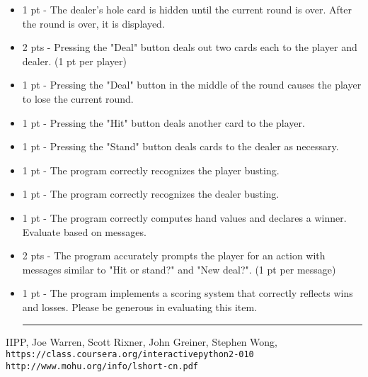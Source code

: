 \documentclass[a4paper,14pt]{article}
\begin{document}
\begin{CJK}{UTF8}{gkai}
\begin{itemize}
\item 1 pt - The dealer's hole card is hidden until the current round is over. After the round is over, it is displayed.

\item 2 pts - Pressing the "Deal" button deals out two cards each to the player and dealer. (1 pt per player)

\item 1 pt - Pressing the "Deal" button in the middle of the round causes the player to lose the current round.

\item 1 pt - Pressing the "Hit" button deals another card to the player.

\item 1 pt - Pressing the "Stand" button deals cards to the dealer as necessary.

\item 1 pt - The program correctly recognizes the player busting.

\item 1 pt - The program correctly recognizes the dealer busting.

\item 1 pt - The program correctly computes hand values and declares a winner. Evaluate based on messages.

\item 2 pts - The program accurately prompts the player for an action with messages similar to "Hit or stand?" and "New deal?". (1 pt per message)

\item 1 pt - The program implements a scoring system that correctly reflects wins and losses. Please be generous in evaluating this item.

\rule{\textwidth}{0.5pt}

\end{itemize}








\medskip

\begin{thebibliography}{9}
IIPP, Joe Warren, Scott Rixner, John Greiner, Stephen Wong, \\\texttt{https://class.coursera.org/interactivepython2-010}
 \texttt{http://www.mohu.org/info/lshort-cn.pdf} 
\end{thebibliography}

\end{CJK}
\end{document}
